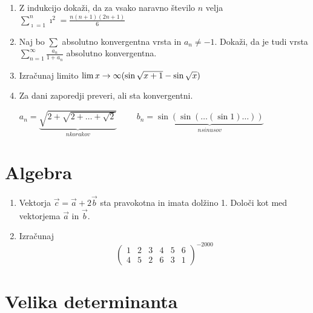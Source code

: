 \documentclass[a4paper,12pt]{article}
\begin{document}
\begin{enumerate}
\item
Z indukcijo dokaži, da za vsako naravno število \(n\) velja
$\sum_{\imath = 1}^{n}\imath^2 = \frac{n(n+1)(2n + 1)}{6}  $

\item
Naj bo $\sum$ absolutno konvergentna vrsta in \(a_n \ne -1\).
Dokaži, da je tudi vrsta \(\sum_{n=1}^\infty \frac{a_n}{1+a_n}\)
absolutno konvergentna.

\item
Izračunaj limito
$ \lim{\scriptsize x\rightarrow\infty}(\sin\sqrt{x+1}-\sin\sqrt{x})$

\item
Za dani zaporedji preveri, ali sta konvergentni.

\qquad $a_n =\underbrace{ \sqrt{2+\sqrt{2+\dots+\sqrt{2}}}}_{n korakov}   \qquad$
$b_n = \underbrace{\sin(\sin(\dots(\sin 1)\dots))}_{n sinusov}$

\end{enumerate}

\section*{Algebra}

\begin{enumerate}
\item
Vektorja $\vec{c}= \vec{a}+ 2\vec{b}$
sta pravokotna in imata dolžino 1. Določi kot med vektorjema \(\vec{a}\) in \(\vec{b}\).

\item
Izračunaj
$$
\begin{pmatrix}
 1 & 2 & 3 & 4 & 5 & 6\\
 4 & 5 & 2 & 6 & 3 & 1
\end{pmatrix}^{-2000}
$$
\end{enumerate}

\section*{Velika determinanta}
\end{document}
